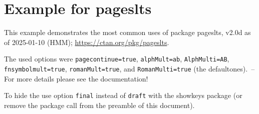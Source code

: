 \documentclass[british]{article}[2024/06/29]%
\begin{document}
\section*{Example for pageslts}

This example demonstrates the most common uses of package\newline
\textsf{pageslts}, v2.0d as of 2025-01-10 (HMM);\newline
\url{https://ctan.org/pkg/pageslts}.\bigskip

The used options were \texttt{pagecontinue=true},
\texttt{alphMult=ab}, \texttt{AlphMulti=AB}, \linebreak
\texttt{fnsymbolmult=true},
\texttt{romanMult=true}, and \texttt{RomanMulti=true}
(the default\linebreak ones).~-- For more details please see the documentation!\bigskip

\label{keys} To hide the \pageref{keys}{\qquad } use option
\texttt{final} instead of \texttt{draft} with the \textsf{showkeys}
package (or remove the package call from the preamble of
this document).\bigskip
\end{document}
